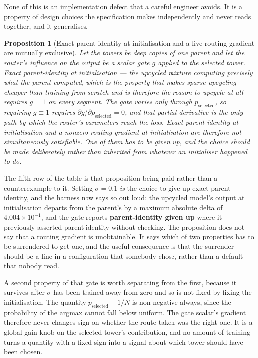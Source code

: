 \documentclass[11pt]{article}
\newtheorem{proposition}{Proposition}
\begin{document}
None of this is an implementation defect that a careful engineer avoids. It is a property of design choices the specification makes independently and never reads together, and it generalises.

\begin{proposition}[Exact parent-identity at initialisation and a live routing gradient are mutually exclusive]
\label{prop:identity}
Let the towers be deep copies of one parent and let the router's influence on the output be a scalar gate $g$ applied to the selected tower. Exact parent-identity at initialisation --- the upcycled mixture computing precisely what the parent computed, which is the property that makes sparse upcycling cheaper than training from scratch and is therefore the reason to upcycle at all --- requires $g = 1$ on every segment. The gate varies only through $p_{\mathrm{selected}}$, so requiring $g \equiv 1$ requires $\partial g/\partial p_{\mathrm{selected}} = 0$, and that partial derivative is the only path by which the router's parameters reach the loss. Exact parent-identity at initialisation and a nonzero routing gradient at initialisation are therefore not simultaneously satisfiable. One of them has to be given up, and the choice should be made deliberately rather than inherited from whatever an initialiser happened to do.
\end{proposition}

The fifth row of the table is that proposition being paid rather than a counterexample to it. Setting $\sigma = 0.1$ \emph{is} the choice to give up exact parent-identity, and the harness now says so out loud: the upcycled model's output at initialisation departs from the parent's by a maximum absolute delta of $4.004\times10^{-1}$, and the gate reports \textbf{parent-identity given up} where it previously asserted parent-identity without checking. The proposition does not say that a routing gradient is unobtainable. It says which of two properties has to be surrendered to get one, and the useful consequence is that the surrender should be a line in a configuration that somebody chose, rather than a default that nobody read.

A second property of that gate is worth separating from the first, because it survives after $\sigma$ has been trained away from zero and so is not fixed by fixing the initialisation. The quantity $p_{\mathrm{selected}} - 1/N$ is non-negative always, since the probability of the argmax cannot fall below uniform. The gate scalar's gradient therefore never changes sign on whether the route taken was the right one. It is a global gain knob on the selected tower's contribution, and no amount of training turns a quantity with a fixed sign into a signal about which tower should have been chosen.
\end{document}
